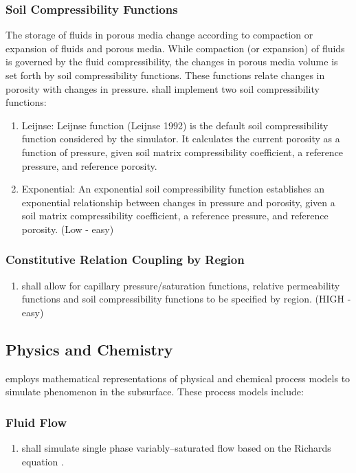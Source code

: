 \subsubsection{Soil Compressibility Functions}
The storage of fluids in porous media change according to compaction or expansion of fluids and porous media. While compaction (or expansion) of fluids is governed by the fluid compressibility, the changes in porous media volume is set forth by soil compressibility functions. These functions relate changes in porosity with changes in pressure. \pft shall implement two soil compressibility functions:
\begin{enumerate}[resume]
	\item Leijnse: \label{leijnse} Leijnse function (Leijnse 1992) is the default soil compressibility function considered by the simulator. It calculates the current porosity as a function of pressure, given soil matrix compressibility coefficient, a reference pressure, and reference porosity.
	\item Exponential: \label{exponential} An exponential soil compressibility function establishes an exponential relationship between changes in pressure and porosity, given a soil matrix compressibility coefficient, a reference pressure, and reference porosity. (Low - easy)
\end{enumerate}
\subsubsection{Constitutive Relation Coupling by Region}
\begin{enumerate}[resume]
	\item \pft shall allow for capillary pressure/saturation functions, relative permeability functions and soil compressibility functions to be specified by region. \label{CRbyRegion} (HIGH - easy)
\end{enumerate}

\subsection{Physics and Chemistry}
\pft employs mathematical representations of physical and chemical process models to simulate phenomenon in the subsurface.  These process models include:
\subsubsection{Fluid Flow}
\begin{enumerate}
	\item \label{PCSngVarSatFlow} \pft shall simulate single phase variably--saturated flow based on the Richards equation \cite{richards1931}. 
\end{enumerate}

